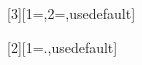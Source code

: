 [3][1=\relax,2={},usedefault]{%
    }



%
%
%
%

[2][1={.},usedefault]{
}

\newcommand*{\draftnote}[1]{%
    \pseudotodo{#1}
}

\newcommand*{\guidance}[1]{%
    \pseudotodo[black!050]{{#1}}
}

\newcommand*{\outline}[1]{%
    \pseudotodo[blue!080]{\textsc{#1}}
}





%
%
\newcommand{\gib}{\gibi\byte}
\newcommand{\mib}{\mebi\byte}
\newcommand{\kib}{\kibi\byte}



%
%
%

